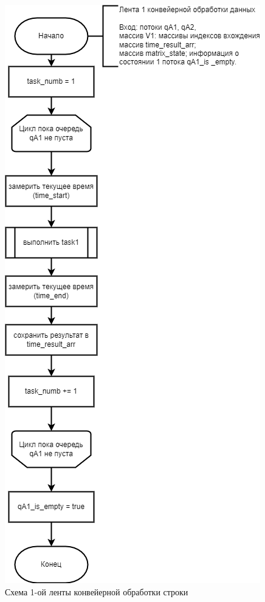 \begin{figure}[h]
	\centering
	\includegraphics[scale=0.6]{img/parallel_stage_1.png}
	\caption{Схема 1-ой ленты конвейерной обработки строки}
	\label{fig:parallel_stage_1}
\end{figure} 

\clearpage

